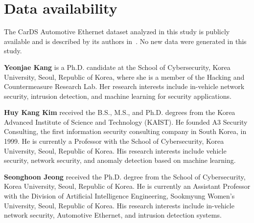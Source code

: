 \documentclass[a4paper,fleqn]{cas-dc}
\begin{document}
\section*{Data availability}
The CarDS Automotive Ethernet dataset analyzed in this study is publicly available and is
described by its authors in~\cite{hellemans2025cards}. No new data were generated in this study.

%




\bio{}
\noindent\textbf{Yeonjae Kang} is a Ph.D. candidate at the School of Cybersecurity, Korea University, Seoul, Republic of Korea, where she is a member of the Hacking and Countermeasure Research Lab. Her research interests include in-vehicle network security, intrusion detection, and machine learning for security applications.
\endbio

\bio{}
\noindent\textbf{Huy Kang Kim} received the B.S., M.S., and Ph.D. degrees from the Korea Advanced Institute of Science and Technology (KAIST). He founded A3 Security Consulting, the first information security consulting company in South Korea, in 1999. He is currently a Professor with the School of Cybersecurity, Korea University, Seoul, Republic of Korea. His research interests include vehicle security, network security, and anomaly detection based on machine learning.
\endbio

\bio{}
\noindent\textbf{Seonghoon Jeong} received the Ph.D. degree from the School of Cybersecurity, Korea University, Seoul, Republic of Korea. He is currently an Assistant Professor with the Division of Artificial Intelligence Engineering, Sookmyung Women's University, Seoul, Republic of Korea. His research interests include in-vehicle network security, Automotive Ethernet, and intrusion detection systems.
\endbio
\end{document}
